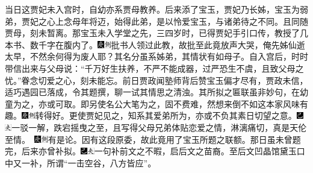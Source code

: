 当日这贾妃未入宫时，自幼亦系贾母教养。后来添了宝玉，贾妃乃长姊，宝玉为弱弟，贾妃之心上念母年将迈，始得此弟，是以怜爱宝玉，与诸弟待之不同。且同随贾母，刻未暂离。那宝玉未入学堂之先，三四岁时，已得贾妃手引口传，教授了几本书、数千字在腹内了。{\includegraphics[width=3mm]{../Images/00004}\includegraphics[width=3mm]{../Images/00011}\footnotesize \kaishu 批书人领过此教，故批至此竟放声大哭，俺先姊仙逝太早，不然余何得为废人耶？}其名分虽系姊弟，其情状有如母子。自入宫后，时时带信出来与父母说：“千万好生扶养，不严不能成器，过严恐生不虞，且致父母之忧。”眷念切爱之心，刻未能忘。前日贾政闻塾师背后赞宝玉偏才尽有，贾政未信，适巧遇园已落成，令其题撰，聊一试其情思之清浊。其所拟之匾联虽非妙句，在幼童为之，亦或可取。即另使名公大笔为之，固不费难，然想来倒不如这本家风味有趣。{\includegraphics[width=3mm]{../Images/00004}\includegraphics[width=3mm]{../Images/00011}\footnotesize \kaishu 转得好。}更使贾妃见之，知系其爱弟所为，亦或不负其素日切望之意。{\includegraphics[width=3mm]{../Images/00003}\includegraphics[width=3mm]{../Images/00012}\footnotesize \kaishu 一驳一解，跌宕摇曳之至，且写得父母兄弟体贴恋爱之情，淋漓痛切，真是天伦至情。　{\includegraphics[width=3mm]{../Images/00004}\includegraphics[width=3mm]{../Images/00011}\footnotesize \kaishu 有是论。}}因有这段原委，故此竟用了宝玉所题之联额。那日虽未曾题完，后来亦曾补拟。{\includegraphics[width=3mm]{../Images/00003}\includegraphics[width=3mm]{../Images/00012}\footnotesize \kaishu 一句补前文之不暇，启后文之苗裔。至后文凹晶馆黛玉口中又一补，所谓“一击空谷，八方皆应”。}

